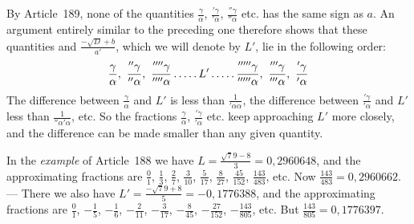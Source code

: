 By Article~189, none of the quantities $\frac{\gamma}{\alpha}$, $\frac{{}'\gamma}{{}'\alpha}$, $\frac{{}''\gamma}{{}''\alpha}$ etc. has the same sign as $a$. An argument entirely similar to the preceding one therefore shows that these quantities and $\frac{-\surd D+b}{a'}$, which we will denote by $L'$, lie in the following order:
\[
\frac{\gamma}{\alpha},\ \frac{{}''\gamma}{{}''\alpha},\ \frac{{}''''\gamma}{{}''''\alpha}\mathinner{\ldotp\ldotp\ldotp\ldotp\ldotp} L'\mathinner{\ldotp\ldotp\ldotp\ldotp\ldotp}\frac{{}'''''\gamma}{{}'''''\alpha},\ \frac{{}'''\gamma}{{}'''\alpha},\ \frac{{}'\gamma}{{}'\alpha}
\]
The difference between $\frac{\gamma}{\alpha}$ and $L'$ is less than $\frac{1}{{}'\alpha\alpha}$, the difference between $\frac{{}'\gamma}{{}'\alpha}$ and $L'$ less than $\frac{1}{{}''\alpha{}'\alpha}$, etc. So the fractions $\frac{\gamma}{\alpha}$, $\frac{{}'\gamma}{{}'\alpha}$ etc. keep approaching $L'$ more closely, and the difference can be made smaller than any given quantity.

In the \textit{example} of Article~188 we have $L=\frac{\surd79-{8}}{3}=0{,}2960648$, and the approximating fractions are $\frac{0}{1}$, $\frac{1}{3}$, $\frac{2}{7}$, $\frac{3}{10}$, $\frac{5}{17}$, $\frac{8}{27}$, $\frac{45}{152}$, $\frac{143}{483}$, etc. Now $\frac{143}{483}=0{,}2960662$. --- There we also have $L'=\frac{-\surd79+{8}}{5}=-0{,}1776388$, and the approximating fractions are $\frac{0}{1}$, $-\frac{1}{5}$, $-\frac{1}{6}$, $-\frac{2}{11}$, $-\frac{3}{17}$, $-\frac{8}{45}$, $-\frac{27}{152}$, $-\frac{143}{805}$, etc. But $\frac{143}{805}=0{,}1776397$.
